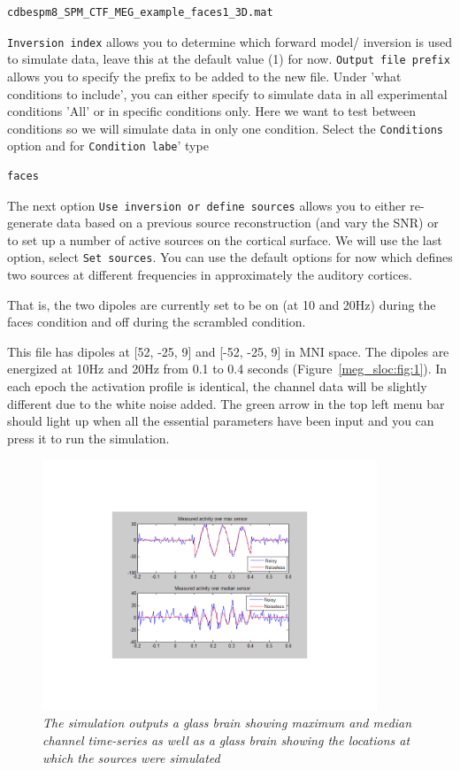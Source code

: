 \begin{verbatim}
cdbespm8_SPM_CTF_MEG_example_faces1_3D.mat
\end{verbatim}

\texttt{Inversion index} allows you to determine which forward model/ inversion is used to simulate data, leave this at the default value (1) for now.
\texttt{Output file prefix} allows you to specify the prefix to be added to the new file.
Under 'what conditions to include',  you can either specify to simulate data in all experimental conditions 'All' or in specific conditions only. Here we want to test between conditions so we will simulate data  in only one condition. Select the \texttt{Conditions} option and for \texttt{Condition labe}'  type 
\begin{verbatim}
faces
\end{verbatim}

The next option \texttt{Use inversion or define sources} allows you to either re-generate data based on a previous source reconstruction (and vary the SNR) or to set up a number of active sources on the cortical surface. We will use the last option, select \texttt{Set sources}. You can use the default options for now which defines two sources at different frequencies in approximately the auditory cortices.

That is, the two dipoles are currently set to be on (at 10 and 20Hz) during the faces condition and off during the scrambled condition.

This file has dipoles at [52, -25, 9] and  [-52, -25, 9] in MNI space. The dipoles are energized at 10Hz and 20Hz from 0.1 to 0.4 seconds (Figure~\ref{meg_sloc:fig:1}). In each epoch the activation profile is identical, the channel data will be slightly different due to the white noise added. The green arrow in the top left menu bar should light up when all the essential parameters have been input and you can press it to run the simulation.

\begin{figure}
\begin{center}
\includegraphics[width=100mm]{meg_sloc/slide2}
\caption{\em The simulation outputs a glass brain showing maximum and median channel time-series as well as a glass brain showing the locations at which the sources were simulated} \label{meg_sloc:fig:2}
\end{center}
\end{figure}

